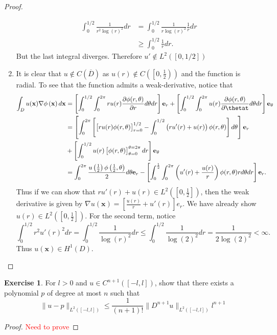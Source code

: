 \documentclass{amsart}
\theoremstyle{plain}
\theoremstyle{definition}
\newtheorem{exer}{Exercise}[section]
\newcommand{\tcr}[1]{\textcolor{red}{#1}}
\begin{document}
\begin{proof}
\begin{enumerate}[label=\alph*.]
\begin{align*}
            \int_{0}^{1/2} \frac{1}{r^2\log(r)^2} dr &= \int_{0}^{1/2} \frac{1}{r\log(r)^2} \frac{1}{r}dr\\
            &\geq \int_{0}^{1/2}  \frac{1}{r}dr.
        \end{align*}
        But the last integral diverges. Therefore $u'\not \in L^2([0,1/2])$
        \item It is clear that $u\not \in C\left(\overline{D}\right)$ as $u(r)\not \in C\left(\left[0,\frac{1}{2}\right)\right)$ and the function is radial. To see that the function admits a weak-derivative, notice that 
        \begin{align*}
            \int_{D} u(\mathbf{x})\nabla \phi\left(\mathbf{x}\right) d\mathbf{x} &= \left[\int_{0}^{1/2}\int_{0}^{2\pi}  r u(r) \frac{\partial \phi(r,\theta)}{\partial r} d\theta dr\right] \mathbf{e}_r + \left[\int_{0}^{1/2}\int_{0}^{2\pi} u(r) \frac{\partial \phi(r,\theta)}{\partial \thetat} d\theta dr \right]\mathbf{e}_\theta\\
            &= \left[\int_{0}^{2\pi} \left[\left[ru(r)\phi(r,\theta)\right]_{r=0}^{1/2}-\int_{0}^{1/2} \left(ru'(r)+u(r)\right)\phi(r,\theta)\right]d\theta\right] \mathbf{e}_r \\
            &+ \left[\int_{0}^{1/2} u(r) \left[\phi(r,\theta)\right]_{\theta=0}^{\theta=2\pi} dr \right]\mathbf{e}_\theta\\
            &= \int_{0}^{2\pi} \frac{u\left(\frac{1}{2}\right)\phi\left(\frac{1}{2},\theta\right)}{2}d\theta \mathbf{e}_r - \left[\int_{0}^{\frac{1}{2}} \int_{0}^{2\pi} \left(u'(r)+\frac{u(r)}{r}\right)\phi(r,\theta) r d\theta dr \right]\mathbf{e}_r.
        \end{align*}
        Thus if we can show that $ru'(r) + u(r) \in L^2\left(\left[0,\frac{1}{2}\right]\right)$, then the weak derivative is given by $\nabla u\left(\mathbf{x}\right) = \left[\frac{u\left(r\right)}{r} + u'(r) \right] e_r.$ We have already show $u(r) \in L^2\left(\left[0,\frac{1}{2}\right]\right)$. For the second term, notice
        $$\int_{0}^{1/2} r^2 u'(r)^2 dr = \int_{0}^{1/2} \frac{1}{\log(r)^2} dr \leq \int_{0}^{1/2} \frac{1}{\log(2)^2} dr = \frac{1}{2\log(2)^2} < \infty. $$
        Thus $u\left(\mathbf{x}\right)\in H^1(D).$
    \end{enumerate}
\end{proof}

\begin{exer}
For  $l >0$ and $u \in C^{n+1}\left(\left[-l,l\right]\right)$, show that there exists a polynomial $p$ of degree at most $n$ such that
$$\|u-p\|_{L^2\left(\left[-l,l\right]\right)} \leq \frac{1}{\left(n+1\right)!}\|D^{n+1}u\|_{L^2\left(\left[-l,l\right]\right)} l^{n+1}$$    
\end{exer}
\begin{proof}
    \tcr{Need to prove}
\end{proof}
\end{document}
